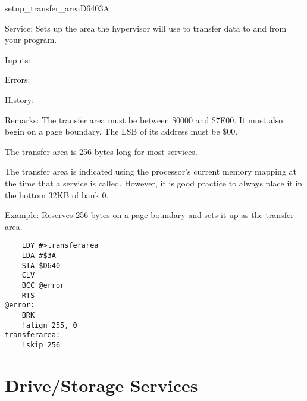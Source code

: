 %
\newpage
\begin{hyppotrap}{setup\_transfer\_area}{D640}{3A}
\item [Service:]
  Sets up the area the hypervisor will use to transfer data to and from your
  program.
\item [Inputs:]
\item [Errors:]
\item [History:]
\item [Remarks:]
  The transfer area must be between \$0000 and \$7E00. It must also begin on a
  page boundary. The LSB of its address must be \$00.

  The transfer area is 256 bytes long for most services.

  The transfer area is indicated using the processor's current memory mapping at
  the time that a service is called. However, it is good practice to always
  place it in the bottom 32KB of bank 0.
\item [Example:]
  Reserves 256 bytes on a page boundary and sets it up as the transfer area.
\begin{tcolorbox}[colback=black,coltext=white]
\verbatimfont{\codefont}
\begin{verbatim}
    LDY #>transferarea
    LDA #$3A
    STA $D640
    CLV
    BCC @error
    RTS
@error:
    BRK
    !align 255, 0
transferarea:
    !skip 256
\end{verbatim}
\end{tcolorbox}
\end{hyppotrap}



\newpage
\section{Drive/Storage Services}


